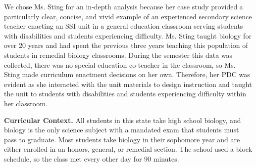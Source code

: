 \documentclass[11.5pt]{sig-alternate}
\begin{document}
\begin{large}
We chose Ms. Sting for an in-depth analysis because her case study provided a particularly clear, concise, and vivid example of an experienced secondary science teacher enacting an SSI unit in a general education classroom serving students with disabilities and students experiencing difficulty. Ms. Sting taught biology for over 20 years and had spent the previous three years teaching this population of students in remedial biology classrooms. During the semester this data was collected, there was no special education co-teacher in the classroom, so Ms. Sting made curriculum enactment decisions on her own. Therefore, her PDC was evident as she interacted with the unit materials to design instruction and taught the unit to students with disabilities and students experiencing difficulty within her classroom.

\textbf{Curricular Context.} All students in this state take high school biology, and biology is the only science subject with a mandated exam that students must pass to graduate. Most students take biology in their sophomore year and are either enrolled in an honors, general, or remedial section. The school used a block schedule, so the class met every other day for 90 minutes.


\end{large}
\end{document}
